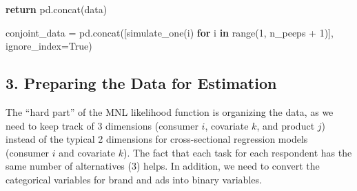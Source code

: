 \documentclass[
  letterpaper,
  DIV=11,
  numbers=noendperiod]{scrartcl}
\newenvironment{Shaded}{\begin{snugshade}}{\end{snugshade}}
\newcommand{\BuiltInTok}[1]{\textcolor[rgb]{0.00,0.23,0.31}{#1}}
\newcommand{\ControlFlowTok}[1]{\textcolor[rgb]{0.00,0.23,0.31}{\textbf{#1}}}
\newcommand{\DecValTok}[1]{\textcolor[rgb]{0.68,0.00,0.00}{#1}}
\newcommand{\KeywordTok}[1]{\textcolor[rgb]{0.00,0.23,0.31}{\textbf{#1}}}
\newcommand{\NormalTok}[1]{\textcolor[rgb]{0.00,0.23,0.31}{#1}}
\newcommand{\OperatorTok}[1]{\textcolor[rgb]{0.37,0.37,0.37}{#1}}
\newcommand{\VariableTok}[1]{\textcolor[rgb]{0.07,0.07,0.07}{#1}}
\begin{document}
\begin{tcolorbox}
\begin{Shaded}
\begin{Highlighting}[]
    \ControlFlowTok{return}\NormalTok{ pd.concat(data)}


\NormalTok{conjoint\_data }\OperatorTok{=}\NormalTok{ pd.concat([simulate\_one(i) }\ControlFlowTok{for}\NormalTok{ i }\KeywordTok{in} \BuiltInTok{range}\NormalTok{(}\DecValTok{1}\NormalTok{, n\_peeps }\OperatorTok{+} \DecValTok{1}\NormalTok{)], ignore\_index}\OperatorTok{=}\VariableTok{True}\NormalTok{)}
\end{Highlighting}
\end{Shaded}

\end{tcolorbox}

\subsection{3. Preparing the Data for
Estimation}\label{preparing-the-data-for-estimation}

The ``hard part'' of the MNL likelihood function is organizing the data,
as we need to keep track of 3 dimensions (consumer \(i\), covariate
\(k\), and product \(j\)) instead of the typical 2 dimensions for
cross-sectional regression models (consumer \(i\) and covariate \(k\)).
The fact that each task for each respondent has the same number of
alternatives (3) helps. In addition, we need to convert the categorical
variables for brand and ads into binary variables.
\end{document}
